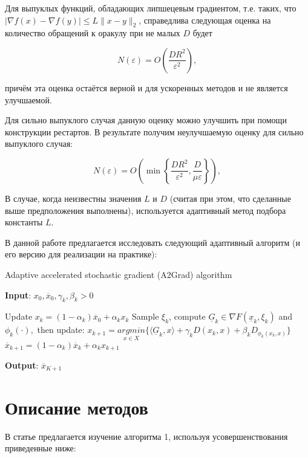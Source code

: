 \documentclass[a4paper,12pt]{article}
\theoremstyle{plain} %
\theoremstyle{definition} %
\theoremstyle{remark} %
\theoremstyle{definition}
\theoremstyle{definition}
\begin{document}
	Для выпуклых функций, обладающих липшецевым градиентом, т.е. таких, что $|\nabla f(x) - \nabla f(y)| \le L\|x-y\|_2$, справедлива следующая оценка на количество обращений к оракулу при не малых $D$ будет 
	
	\begin{equation}
	N(\varepsilon) = O\left(\frac{DR^2}{\varepsilon^2}\right),
	\end{equation}
	
	причём эта оценка остаётся верной и для ускоренных методов и не является улучшаемой. 
	
	Для сильно выпуклого случая данную оценку можно улучшить при помощи конструкции рестартов. В результате получим неулучшаемую оценку для сильно выпуклого случая:
	
	\begin{equation}
	N(\varepsilon) = O\left(\min\left\{\frac{DR^2}{\varepsilon^2}, \frac{D}{\mu \varepsilon}\right\}\right),
	\end{equation}
	
	В случае, когда неизвестны значения $L$ и $D$ (считая при этом, что сделанные выше предположения выполнены), используется адаптивный метод подбора константы $L$. 
	
	В данной работе предлагается исследовать следующий адаптивный алгоритм (и его версию для реализации на практике):
	
	\begin{algorithm}[h!]
		\caption{Adaptive accelerated stochastic gradient (A2Grad) algorithm}
		\hspace*{\algorithmicindent} \textbf{Input}: $x_{0}, \overline{x}_{0}, \gamma_{k}, \beta_{k} > 0$
		\begin{algorithmic}[1]
			\STATE Update $x_{k}=(1-\alpha_{k})\overline{x}_{0}+\alpha_{k}x_{k}$
			\STATE Sample $\xi_{k}$, compute $\underline{G}_{k} \in \nabla F(\underline{x}_{k}, \xi_{k})$ and $\phi_{k}(\cdot),$ then update:
			\STATE $x_{k+1}=\underset{x\in X}{argmin}\{\langle \underline{G}_{k}, x\rangle +\gamma_{k}D(x_{k},x)+\beta_{k}D_{\phi_{k}(x_{k},x)} \}$
			\STATE $\overline{x}_{k+1}=(1-\alpha_{k})\overline{x}_{k}+\alpha_{k}x_{k+1}$
			\ENDFOR
		\end{algorithmic}
		\textbf{Output}: $\overline{x}_{K+1}$
	\end{algorithm}
	
	
	\newpage	
	\section{Описание методов}
	В статье предлагается изучение алгоритма 1, используя усовершенствования приведенные ниже:
	
\end{document}
